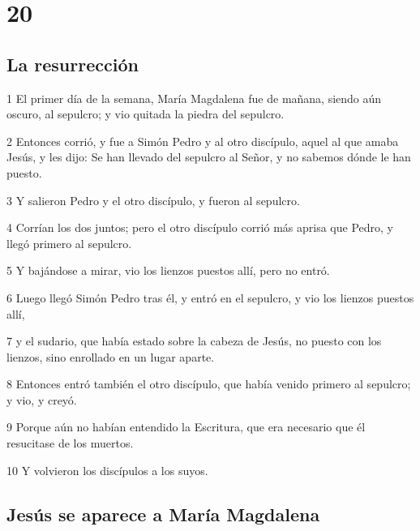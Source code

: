 \chapter{20}

\section*{La resurrección}

\par 1 El primer día de la semana, María Magdalena fue de mañana, siendo aún oscuro, al sepulcro; y vio quitada la piedra del sepulcro.
\par 2 Entonces corrió, y fue a Simón Pedro y al otro discípulo, aquel al que amaba Jesús, y les dijo: Se han llevado del sepulcro al Señor, y no sabemos dónde le han puesto.
\par 3 Y salieron Pedro y el otro discípulo, y fueron al sepulcro.
\par 4 Corrían los dos juntos; pero el otro discípulo corrió más aprisa que Pedro, y llegó primero al sepulcro.
\par 5 Y bajándose a mirar, vio los lienzos puestos allí, pero no entró.
\par 6 Luego llegó Simón Pedro tras él, y entró en el sepulcro, y vio los lienzos puestos allí,
\par 7 y el sudario, que había estado sobre la cabeza de Jesús, no puesto con los lienzos, sino enrollado en un lugar aparte.
\par 8 Entonces entró también el otro discípulo, que había venido primero al sepulcro; y vio, y creyó.
\par 9 Porque aún no habían entendido la Escritura, que era necesario que él resucitase de los muertos.
\par 10 Y volvieron los discípulos a los suyos.

\section*{Jesús se aparece a María Magdalena}

